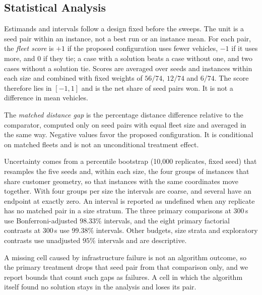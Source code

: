 \documentclass{ieeeaccess}
\begin{document}
\subsection{Statistical Analysis}
\label{sec:statistics}
Estimands and intervals follow a design fixed before the sweeps. The unit is a seed pair within an instance, not a best run or an instance mean. For each pair, the \emph{fleet score} is $+1$ if the proposed configuration uses fewer vehicles, $-1$ if it uses more, and $0$ if they tie; a case with a solution beats a case without one, and two cases without a solution tie. Scores are averaged over seeds and instances within each size and combined with fixed weights of $56/74$, $12/74$ and $6/74$. The score therefore lies in $[-1, 1]$ and is the net share of seed pairs won. It is not a difference in mean vehicles.

The \emph{matched distance gap} is the percentage distance difference relative to the comparator, computed only on seed pairs with equal fleet size and averaged in the same way. Negative values favor the proposed configuration. It is conditional on matched fleets and is not an unconditional treatment effect.

Uncertainty comes from a percentile bootstrap (10,000 replicates, fixed seed) that resamples the five seeds and, within each size, the four groups of instances that share customer geometry, so that instances with the same coordinates move together. With four groups per size the intervals are coarse, and several have an endpoint at exactly zero. An interval is reported as undefined when any replicate has no matched pair in a size stratum. The three primary comparisons at 300\,s use Bonferroni-adjusted $98.33\%$ intervals, and the eight primary factorial contrasts at 300\,s use $99.38\%$ intervals. Other budgets, size strata and exploratory contrasts use unadjusted $95\%$ intervals and are descriptive.

A missing cell caused by infrastructure failure is not an algorithm outcome, so the primary treatment drops that seed pair from that comparison only, and we report bounds that count such gaps as failures. A cell in which the algorithm itself found no solution stays in the analysis and loses its pair.
\end{document}
